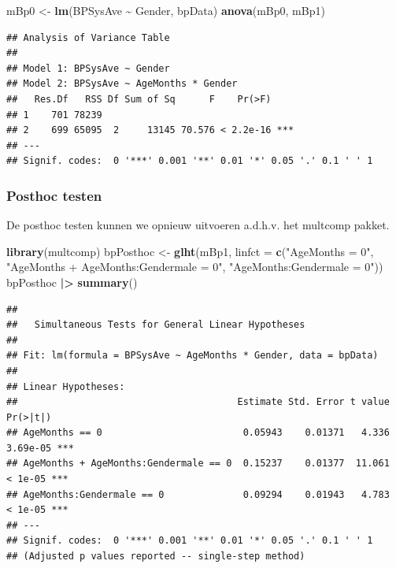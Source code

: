 \documentclass[
  12pt,dutch]{book}
\newenvironment{Shaded}{\begin{snugshade}}{\end{snugshade}}
\newcommand{\AttributeTok}[1]{\textcolor[rgb]{0.13,0.29,0.53}{#1}}
\newcommand{\FunctionTok}[1]{\textcolor[rgb]{0.13,0.29,0.53}{\textbf{#1}}}
\newcommand{\NormalTok}[1]{#1}
\newcommand{\OtherTok}[1]{\textcolor[rgb]{0.56,0.35,0.01}{#1}}
\newcommand{\SpecialCharTok}[1]{\textcolor[rgb]{0.81,0.36,0.00}{\textbf{#1}}}
\newcommand{\StringTok}[1]{\textcolor[rgb]{0.31,0.60,0.02}{#1}}
\theoremstyle{definition}
\theoremstyle{definition}
\theoremstyle{definition}
\theoremstyle{definition}
\theoremstyle{remark}
\begin{document}
\begin{Shaded}
\begin{Highlighting}[]
\NormalTok{mBp0 }\OtherTok{\textless{}{-}} \FunctionTok{lm}\NormalTok{(BPSysAve }\SpecialCharTok{\textasciitilde{}}\NormalTok{ Gender, bpData)}
\FunctionTok{anova}\NormalTok{(mBp0, mBp1)}
\end{Highlighting}
\end{Shaded}

\begin{verbatim}
## Analysis of Variance Table
## 
## Model 1: BPSysAve ~ Gender
## Model 2: BPSysAve ~ AgeMonths * Gender
##   Res.Df   RSS Df Sum of Sq      F    Pr(>F)    
## 1    701 78239                                  
## 2    699 65095  2     13145 70.576 < 2.2e-16 ***
## ---
## Signif. codes:  0 '***' 0.001 '**' 0.01 '*' 0.05 '.' 0.1 ' ' 1
\end{verbatim}

\subsubsection{Posthoc testen}\label{posthoc-testen}

De posthoc testen kunnen we opnieuw uitvoeren a.d.h.v. het multcomp pakket.

\begin{Shaded}
\begin{Highlighting}[]
\FunctionTok{library}\NormalTok{(multcomp)}
\NormalTok{bpPosthoc }\OtherTok{\textless{}{-}} \FunctionTok{glht}\NormalTok{(mBp1, }\AttributeTok{linfct =} \FunctionTok{c}\NormalTok{(}\StringTok{"AgeMonths = 0"}\NormalTok{,}
    \StringTok{"AgeMonths + AgeMonths:Gendermale = 0"}\NormalTok{, }\StringTok{"AgeMonths:Gendermale = 0"}\NormalTok{))}
\NormalTok{bpPosthoc }\SpecialCharTok{|\textgreater{}}
    \FunctionTok{summary}\NormalTok{()}
\end{Highlighting}
\end{Shaded}

\begin{verbatim}
## 
##   Simultaneous Tests for General Linear Hypotheses
## 
## Fit: lm(formula = BPSysAve ~ AgeMonths * Gender, data = bpData)
## 
## Linear Hypotheses:
##                                       Estimate Std. Error t value Pr(>|t|)    
## AgeMonths == 0                         0.05943    0.01371   4.336 3.69e-05 ***
## AgeMonths + AgeMonths:Gendermale == 0  0.15237    0.01377  11.061  < 1e-05 ***
## AgeMonths:Gendermale == 0              0.09294    0.01943   4.783  < 1e-05 ***
## ---
## Signif. codes:  0 '***' 0.001 '**' 0.01 '*' 0.05 '.' 0.1 ' ' 1
## (Adjusted p values reported -- single-step method)
\end{verbatim}
\end{document}
